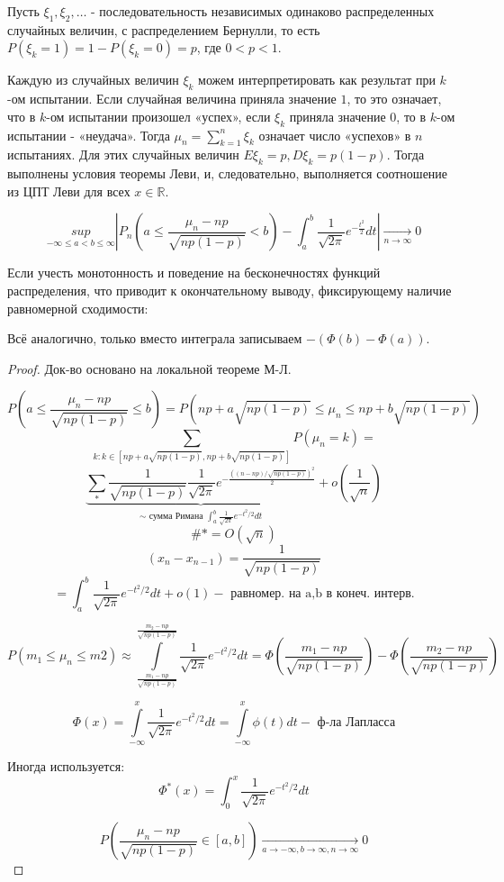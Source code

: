 \begin{theorem}
	Пусть $\xi_1, \xi_2, \dots$ - последовательность независимых одинаково распределенных случайных величин, с распределением Бернулли, то есть $P(\xi_k = 1) = 1 - P(\xi_k = 0) = p$, где $0 < p < 1$.
	
	Каждую из случайных величин $\xi_k$ можем интерпретировать как результат при $k$-ом испытании. Если случайная величина приняла значение $1$, то это означает, что в $k$-ом испытании произошел «успех», если $\xi_k$ приняла значение 0, то в $k$-ом испытании - «неудача». Тогда $\mu_n = \sum\limits_{k=1}^{n} \xi_k$ означает число «успехов» в $n$ испытаниях. Для этих случайных величин $E\xi_k = p, D\xi_k = p(1-p)$. Тогда выполнены условия теоремы Леви, и, следовательно, выполняется соотношение из ЦПТ Леви для всех $x \in \mathbb{R}$.
	
	\[ \underset{-\infty \le a < b \le \infty}{sup} \left| P_n \left( a \le \dfrac{\mu_n - np}{\sqrt{np(1 - p)}} < b \right) - \int_{a}^{b} \dfrac{1}{\sqrt{2 \pi}} e^{-\frac{t^2}{2}}dt \right| \underset{n \to \infty}{\to} 0 \]
	
	Если учесть монотонность и поведение на бесконечностях функций распределения, что приводит к окончательному выводу, фиксирующему наличие равномерной сходимости:
	
	Всё аналогично, только вместо интеграла записываем $- (\Phi (b) - \Phi (a))$.
	
	\begin{proof}
		Док-во основано на локальной теореме М-Л.
		
		\[ P \left( a \le \dfrac{\mu_n - np}{\sqrt{np(1-p)}} \le b \right) = P(np + a\sqrt{np(1-p)} \le \mu_n \le np + b\sqrt{np(1-p)}) \]
		\[ \underset{k: k \in [np+a\sqrt{np(1-p)}, np + b\sqrt{np(1-p)}]}{\sum} P(\mu_n = k) =  \]
		\[ \underbrace{\sum_{*} \dfrac{1}{\sqrt{np(1-p)}} \dfrac{1}{\sqrt{2 \pi}} e^{-\frac{((n-np)/\sqrt{np(1-p)})^2}{2}}}_{\sim \text{ сумма Римана } \int_{a}^b \frac{1}{\sqrt{2 \pi}}e^{-t^2/2}dt} + o\left(\dfrac{1}{\sqrt{n}}\right) \]
		\[ \#* = O(\sqrt{n}) \]
		\[ (x_n - x_{n-1}) = \dfrac{1}{\sqrt{np(1-p)}} \]
		\[ = \int_{a}^b \dfrac{1}{\sqrt{2 \pi}} e^{-t^2/2}dt + o(1) - \text{ равномер. на a,b в конеч. интерв.} \]
		
		\[ P(m_1 \le \mu_n \le m2) \approx \int\limits_{\frac{m_1-np}{\sqrt{np(1-p)}}}^{\frac{m_2-np}{\sqrt{np(1-p)}}} \dfrac{1}{\sqrt{2 \pi}} e^{-t^2/2}dt = \Phi \left( \dfrac{m_1-np}{\sqrt{np(1-p)}} \right) - \Phi \left( \dfrac{m_2-np}{\sqrt{np(1-p)}} \right) \]

		\[ \Phi(x) = \int\limits_{-\infty}^{x} \dfrac{1}{\sqrt{2 \pi}} e^{-t^2/2}dt = \int\limits_{-\infty}^{x} \phi (t) dt - \text{ ф-ла Лапласса} \]
		
		Иногда используется:
		\[ \Phi^*(x) = \int_{0}^{x} \dfrac{1}{\sqrt{2 \pi}} e^{-t^2/2}dt \]
		
		\[ P \left( \dfrac{\mu_n - np}{\sqrt{np(1-p)}} \in [a,b] \right) \underset{a \to - \infty, b \to \infty, n \to \infty}{\to} 0 \]
	\end{proof}
\end{theorem}

